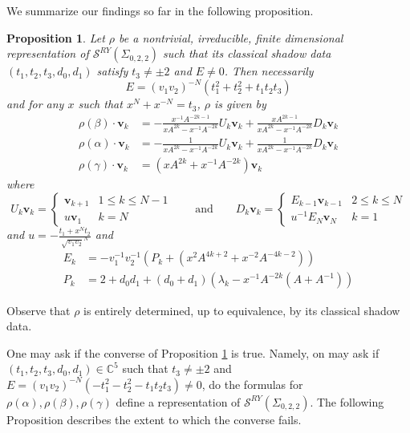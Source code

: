 \documentclass{article}
\newcommand{\C}{\mathbb{C}}
\renewcommand{\v}{\mathbf{v}}
\renewcommand{\a}{\alpha}
\renewcommand{\b}{\beta}
\newcommand{\g}{\gamma}
\newcommand{\SRY}{\mathcal{S}^{RY}}
\newcommand{\san}{\Sigma_{0,2,2}}
\newtheorem{proposition}[theorem]{Proposition}
\theoremstyle{definition}
\renewcommand{\g}{\gamma}
\renewcommand{\a}{\alpha}
\renewcommand{\b}{\beta}
\renewcommand{\san}{\Sigma_{0, 2, 2}}
\renewcommand{\SRY}{\ensuremath{ \mathcal S^{RY}}}
\begin{document}
We summarize our findings so far in the following proposition. 

\begin{proposition}\label{thm:rho-description}
    Let $\rho$ be a nontrivial, irreducible, finite dimensional representation of $\mathcal{S}^{RY}(\Sigma_{0,2,2})$  such that its classical shadow data $(t_1, t_2, t_3, d_0, d_1)$  satisfy $t_3\neq \pm 2$ and $E\neq 0$. Then necessarily 
    \[
    E=(v_1v_2)^{-N}(t_1^2+t_2^2+t_1t_2t_3)
    \]
 and for any $x$ such that $x^N + x^{-N} = t_3$, $\rho$ is given by
    \begin{align*}
        \rho(\b)\cdot \v_k&=-\frac{x^{-1}A^{-2k-1}}{xA^{2k}-x^{-1}A^{-2k}}U_k\v_k+\frac{xA^{2k-1}}{xA^{2k}-x^{-1}A^{-2k}}D_k\v_k\\
        \rho(\a)\cdot \v_k&=-\frac{1}{xA^{2k}-x^{-1}A^{-2k}}U_k\v_k+\frac{1}{xA^{2k}-x^{-1}A^{-2k}}D_k\v_k\\
        \rho(\g)\cdot \v_k&=(xA^{2k}+x^{-1}A^{-2k})\v_k
    \end{align*}
    where
    \[
    U_k\v_k=\begin{cases}
        \v_{k+1}&1\leq k\leq N-1\\
        u\v_1&k=N
    \end{cases}
    \qquad \text{and}\qquad 
     D_k\v_k=\begin{cases}
        E_{k-1}\v_{k-1} & 2\leq k \leq N\\
        u^{-1}E_N\v_N & k=1
    \end{cases}
    \]
    and $u=-\frac{t_1+x^Nt_2}{\sqrt{v_1v_2}^{N}}$ and 
    \begin{align*}
        E_k&=-v_1^{-1}v_2^{-1}(P_k+(x^2A^{4k+2}+x^{-2}A^{-4k-2}))\\
        P_k&=2+d_0d_1+(d_0+d_1)(\lambda_k-x^{-1}A^{-2k}(A+A^{-1}))
    \end{align*}
\end{proposition}



Observe that  $\rho$ is entirely determined, up to equivalence, by its classical shadow data. 

One may ask if the converse of Proposition \ref{thm:rho-description} is true. Namely, on may ask if  $(t_1,t_2,t_3,d_0,d_1)\in \C^5$ such that $t_3\neq \pm 2$ and $E=(v_1v_2)^{-N}(-t_1^2-t_2^2-t_1t_2t_3)\neq 0$, do the formulas for $\rho(\alpha),\rho(\beta),\rho(\gamma)$ define a representation of $\SRY(\san)$. The following Proposition describes the extent to which the converse fails.
\end{document}
